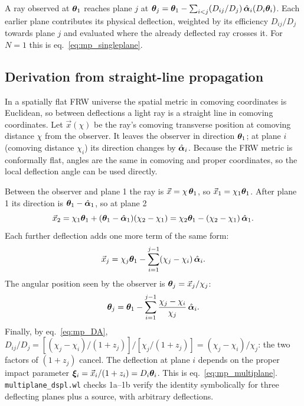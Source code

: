 \begin{keybox}
A ray observed at $\boldsymbol{\theta}_1$ reaches plane $j$ at
$\boldsymbol{\theta}_j=\boldsymbol{\theta}_1-\sum_{i<j}(D_{ij}/D_j)\,\hat{\boldsymbol{\alpha}}_i(D_i\boldsymbol{\theta}_i)$.
Each earlier plane contributes its physical deflection, weighted by its
efficiency $D_{ij}/D_j$ towards plane $j$ and evaluated where the
already deflected ray crosses it.  For $N=1$ this is
eq.~\eqref{eq:mp_singleplane}.
\end{keybox}

\subsection{Derivation from straight-line propagation}

In a spatially flat FRW universe the spatial metric in comoving
coordinates is Euclidean, so between deflections a light ray is a
straight line in comoving coordinates.  Let $\vec{x}(\chi)$ be the ray's
comoving transverse position at comoving distance $\chi$ from the
observer.  It leaves the observer in direction $\boldsymbol{\theta}_1$; at plane
$i$ (comoving distance $\chi_i$) its direction changes by
$\hat{\boldsymbol{\alpha}}_i$.  Because the FRW metric is conformally flat, angles
are the same in comoving and proper coordinates, so the local deflection
angle can be used directly.

\begin{derivation}
Between the observer and plane 1 the ray is $\vec{x}=\chi\,\boldsymbol{\theta}_1$,
so $\vec{x}_1=\chi_1\boldsymbol{\theta}_1$.  After plane 1 its direction is
$\boldsymbol{\theta}_1-\hat{\boldsymbol{\alpha}}_1$, so at plane 2
\[
  \vec{x}_2=\chi_1\boldsymbol{\theta}_1+(\boldsymbol{\theta}_1-\hat{\boldsymbol{\alpha}}_1)(\chi_2-\chi_1)
           =\chi_2\boldsymbol{\theta}_1-(\chi_2-\chi_1)\,\hat{\boldsymbol{\alpha}}_1 .
\]
Each further deflection adds one more term of the same form:
\[
  \vec{x}_j=\chi_j\boldsymbol{\theta}_1-\sum_{i=1}^{j-1}(\chi_j-\chi_i)\,\hat{\boldsymbol{\alpha}}_i .
\]
The angular position seen by the observer is $\boldsymbol{\theta}_j=\vec{x}_j/\chi_j$:
\[
  \boldsymbol{\theta}_j=\boldsymbol{\theta}_1-\sum_{i=1}^{j-1}\frac{\chi_j-\chi_i}{\chi_j}\,\hat{\boldsymbol{\alpha}}_i .
\]
Finally, by eq.~\eqref{eq:mp_DA},
$D_{ij}/D_j=[(\chi_j-\chi_i)/(1+z_j)]/[\chi_j/(1+z_j)]=(\chi_j-\chi_i)/\chi_j$:
the two factors of $(1+z_j)$ cancel.  The deflection at plane $i$
depends on the proper impact parameter
$\boldsymbol{\xi}_i=\vec{x}_i/(1+z_i)=D_i\boldsymbol{\theta}_i$.  This is
eq.~\eqref{eq:mp_multiplane}.  \texttt{multiplane\_dspl.wl} checks 1a--1b
verify the identity symbolically for three deflecting planes plus a
source, with arbitrary deflections.
\end{derivation}

